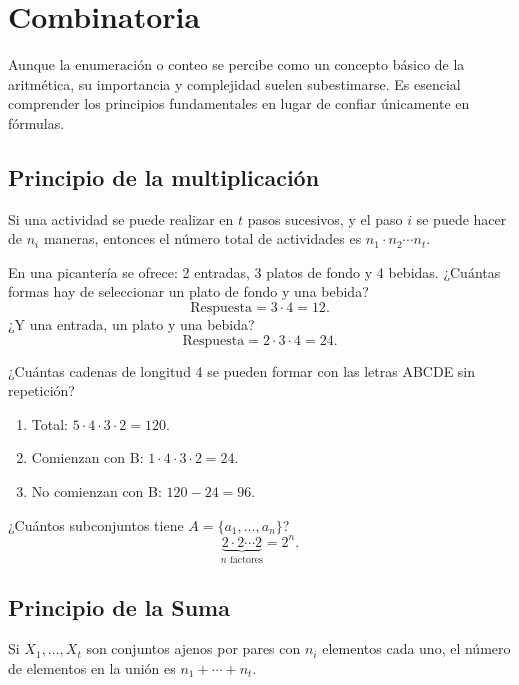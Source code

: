 \chapter{Combinatoria}

Aunque la enumeración o conteo se percibe como un concepto básico de la aritmética, su importancia y complejidad suelen subestimarse. Es esencial comprender los principios fundamentales en lugar de confiar únicamente en fórmulas.

\section{Principio de la multiplicación}

Si una actividad se puede realizar en $t$ pasos sucesivos, y el paso $i$ se puede hacer de $n_i$ maneras, entonces el número total de actividades es $n_1 \cdot n_2 \cdots n_t$.

\begin{ejemplo}
En una picantería se ofrece: 2 entradas, 3 platos de fondo y 4 bebidas. ¿Cuántas formas hay de seleccionar un plato de fondo y una bebida?
\[
\text{Respuesta} = 3 \cdot 4 = 12.
\]
¿Y una entrada, un plato y una bebida?
\[
\text{Respuesta} = 2 \cdot 3 \cdot 4 = 24.
\]
\end{ejemplo}

\begin{ejemplo}
¿Cuántas cadenas de longitud 4 se pueden formar con las letras ABCDE sin repetición?
\begin{enumerate}[label=\alph*)]
  \item Total: $5 \cdot 4 \cdot 3 \cdot 2 = 120$.
  \item Comienzan con B: $1 \cdot 4 \cdot 3 \cdot 2 = 24$.
  \item No comienzan con B: $120 - 24 = 96$.
\end{enumerate}
\end{ejemplo}

\begin{ejemplo}
¿Cuántos subconjuntos tiene $A = \{a_1, \ldots, a_n\}$?
\[
\underbrace{2 \cdot 2 \cdots 2}_{n \text{ factores}} = 2^n.
\]
\end{ejemplo}

\section{Principio de la Suma}

Si $X_1, \ldots, X_t$ son conjuntos ajenos por pares con $n_i$ elementos cada uno, el número de elementos en la unión es $n_1 + \cdots + n_t$.

